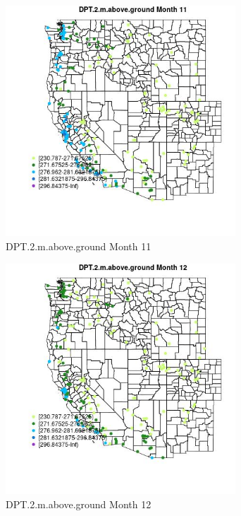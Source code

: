 \begin{figure} 
\centering  
\includegraphics[width=0.77\textwidth]{Code_Outputs/Report_ML_input_PM25_Step4_part_e_de_duplicated_aveswNAs_MapObsMo11DPT2maboveground.jpg} 
\caption{\label{fig:Report_ML_input_PM25_Step4_part_e_de_duplicated_aveswNAsMapObsMo11DPT2maboveground}DPT.2.m.above.ground Month 11} 
\end{figure} 
 

\begin{figure} 
\centering  
\includegraphics[width=0.77\textwidth]{Code_Outputs/Report_ML_input_PM25_Step4_part_e_de_duplicated_aveswNAs_MapObsMo12DPT2maboveground.jpg} 
\caption{\label{fig:Report_ML_input_PM25_Step4_part_e_de_duplicated_aveswNAsMapObsMo12DPT2maboveground}DPT.2.m.above.ground Month 12} 
\end{figure} 
 

